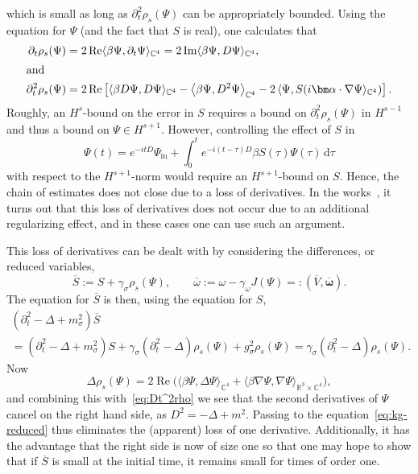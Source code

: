 \documentclass[AHL,Unicode,longabstracts,published]{cedram}
\DeclareMathOperator{\im}{Im}
\DeclareMathOperator{\re}{Re}
\newcommand{\rmin}{\mathrm{in}}
\newcommand\R{\mathbb{R}}
\newcommand\C{\mathbb{C}}
\renewcommand\bar{\overline}
\renewcommand\d[1]{{\ensuremath{\,\text{d}#1}}}
\begin{document}
which is small as long as $\partial_t^2\rho_s(\Psi)$ can be appropriately bounded. Using the equation for $\Psi$ (and the fact that $S$ is real), one calculates that
\begin{align}
\partial_t \rho_s(\Psi) &= 2\re\langle \beta\Psi,\partial_t\Psi\rangle_{\C^4} =2\im\langle \beta\Psi,D\Psi\rangle_{\C^4},
\\
\intertext{and}
\partial_t^2 \rho_s(\Psi) &=2\re\left[\langle\beta D\Psi,D\Psi\rangle_{\C^4}-\left\langle\beta\Psi,D^2\Psi\right\rangle_{\C^4}
-2\left\langle\Psi,S(i \bm \alpha\cdot\nabla
 \Psi\rangle_{\C^4}\right)\right].\label{eq:Dt^2rho}
\end{align}
Roughly, an $H^s$-bound on the error in $S$ requires a bound on $\partial_t^2 \rho_s(\Psi)$ in $H^{s-1}$ and thus a bound on $\Psi\in H^{s+1}$. However, controlling the effect of $S$ in
\begin{equation}\label{eq:PsiDuhamel}
\Psi(t)=e^{-itD}\Psi_\rmin+\int_0^te^{-i(t-\tau)D}{ \beta}S(\tau)\Psi(\tau)\d \tau
\end{equation}
with respect to the $H^{s+1}$-norm would require an $H^{s+1}$-bound on $S$. Hence, the chain of estimates does not close due to a loss of derivatives. In the works~\cite{baumstark2020,daub2016,griesemer2017}, it turns out that this loss of derivatives does not occur due to an additional regularizing effect, and in these cases one can use such an argument.

This loss of derivatives can be dealt with by considering the differences, or reduced variables,
\begin{equation}\label{eq:var-red}
\overline{S}:=S+\gamma_\sigma \rho_s(\Psi), \qquad \overline{\omega}:=\omega-\gamma_\omega J(\Psi)=:(\overline{V}, \overline{\bm \omega}).
\end{equation}
The equation for $\overline{S}$ is then, using the equation for $S$,
\begin{multline}\label{eq:kg-reduced}
\left(\partial_t^2-\Delta+m_\sigma^2\right)\bar{S}\\
=\left(\partial_t^2-\Delta+m_\sigma^2\right)S+\gamma_\sigma\left(\partial_t^2-\Delta\right)\rho_s(\Psi)+g_\sigma^2 \rho_s(\Psi)=\gamma_\sigma\left(\partial_t^2-\Delta\right)\rho_s(\Psi).
\end{multline}
Now
\begin{equation}
\Delta \rho_s(\Psi) = 2\re \big(\langle \beta \Psi, \Delta \Psi \rangle_{\C^4} + \langle \beta \nabla\Psi, \nabla \Psi \rangle_{\R^3\times \C^4}\big),
\end{equation}
and combining this with~\eqref{eq:Dt^2rho} we see that the second derivatives of $\Psi$ cancel on the right hand side, as $D^2=-\Delta+m^2$. Passing to the equation~\eqref{eq:kg-reduced} thus eliminates the (apparent) loss of one derivative. Additionally, it has the advantage that the right side is now of size one so that one may hope to show that if $\bar{S}$ is small at the initial time, it remains small for times of order one.
\end{document}
